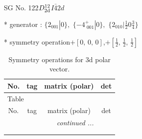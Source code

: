 \documentclass[fleqn,8pt]{jsarticle}
\begin{document}
\setcounter{MaxMatrixCols}{32}

\renewcommand{\tablename}{Table~}
\renewcommand{\figurename}{Figure~}
\begin{center}
\LARGE
SG No. 122\quad$D_{\rm 2d}^{12}$\quad$I\bar{4}2d$\quad[ tetragonal ]
\end{center}

* generator : $\{2{}_{001}|0\},\,\,\{-4^{+}_{\,\,001}|0\},\,\,\{2{}_{010}|\frac{1}{2} 0 \frac{3}{4}\}$

* symmetry operation\quad$+\left[ 0,\, 0,\, 0 \right]$,\quad $+\left[ \frac{1}{2},\, \frac{1}{2},\, \frac{1}{2} \right]$
\renewcommand{\arraystretch}{1.3}
\begin{longtable}{cccc}
\caption{Symmetry operations for 3d polar vector.}
 \\
 \hline \hline
No. & tag & matrix (polar) & det \\ \hline \endfirsthead

\multicolumn{3}{l}{\tablename\ \thetable{}} \\
 \hline \hline
No. & tag & matrix (polar) & det \\ \hline \endhead

 \hline \hline
\multicolumn{3}{r}{\footnotesize\it continued ...} \\ \endfoot

 \hline \hline
\multicolumn{3}{r}{} \\ \endlastfoot


\end{longtable}
\end{document}
